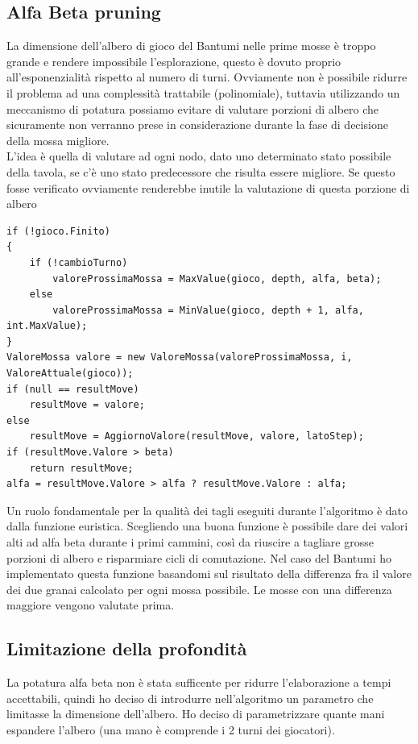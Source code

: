 \documentclass[paper=a4, fontsize=11pt]{scrartcl}	%
\numberwithin{equation}{section}															%
\numberwithin{figure}{section}																%
\numberwithin{table}{section}																%
\begin{document}
\subsection{Alfa Beta pruning}
La dimensione dell'albero di gioco del Bantumi nelle prime mosse \`e troppo grande e rendere impossibile l'esplorazione, questo \`e dovuto proprio all'esponenzialit\`a rispetto al numero di turni. Ovviamente non \`e possibile ridurre il problema ad una complessit\`a trattabile (polinomiale), tuttavia utilizzando un meccanismo di potatura possiamo evitare di valutare porzioni di albero che sicuramente non verranno prese in considerazione durante la fase di decisione della mossa migliore.\\ 
L'idea \`e quella di valutare ad ogni nodo, dato uno determinato stato possibile della tavola, se c'\`e uno stato predecessore che risulta essere migliore. Se questo fosse verificato ovviamente renderebbe inutile la valutazione di questa porzione di albero
\begin{lstlisting}[label=maxPruning,caption=Implementazione Max con taglio]
if (!gioco.Finito)
{
    if (!cambioTurno)
        valoreProssimaMossa = MaxValue(gioco, depth, alfa, beta);
    else
        valoreProssimaMossa = MinValue(gioco, depth + 1, alfa, int.MaxValue);
}
ValoreMossa valore = new ValoreMossa(valoreProssimaMossa, i, ValoreAttuale(gioco));
if (null == resultMove)
	resultMove = valore;
else
	resultMove = AggiornoValore(resultMove, valore, latoStep);
if (resultMove.Valore > beta)
    return resultMove;
alfa = resultMove.Valore > alfa ? resultMove.Valore : alfa;
\end{lstlisting}



Un ruolo fondamentale per la qualit\`a dei tagli eseguiti durante l'algoritmo \`e dato dalla funzione euristica. Scegliendo una buona funzione \`e possibile dare dei valori alti ad alfa beta durante i primi cammini, cos\`i da riuscire a tagliare grosse porzioni di albero e risparmiare cicli di comutazione.
Nel caso del Bantumi ho implementato questa funzione basandomi sul risultato della differenza fra il valore dei due granai calcolato per ogni mossa possibile. Le mosse con una differenza maggiore vengono valutate prima.
\subsection{Limitazione della profondit\`a}
La potatura alfa beta non \`e stata sufficente per ridurre l'elaborazione a tempi accettabili, quindi ho deciso di introdurre nell'algoritmo un parametro che limitasse la dimensione dell'albero. Ho deciso di parametrizzare quante mani espandere l'albero (una mano è comprende i 2 turni dei giocatori).
\end{document}
